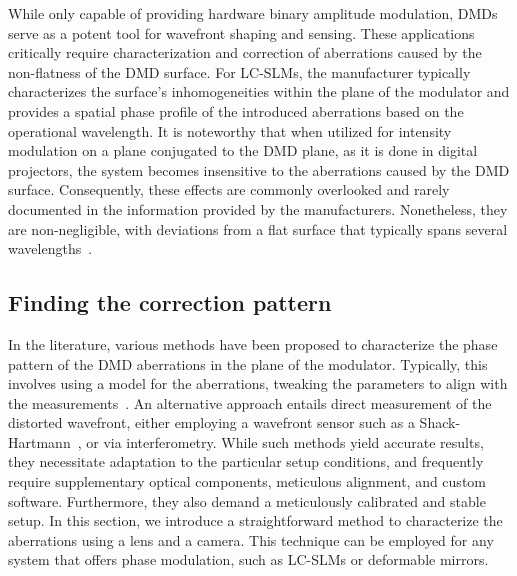 \documentclass[12pt]{iopart}
\begin{document}
While only capable of providing hardware binary amplitude modulation,
DMDs serve as a potent tool for wavefront shaping and sensing.
These applications  critically require characterization and correction of aberrations
caused by the non-flatness of the DMD surface.
For LC-SLMs, the manufacturer typically characterizes the surface's inhomogeneities within the plane of the modulator and
provides a spatial phase profile of the introduced aberrations based on the operational wavelength.
It is noteworthy that when utilized for intensity modulation on a plane conjugated to the DMD plane,
as it is done in digital projectors,
the system becomes insensitive to the aberrations caused by the DMD surface.
Consequently, these effects are commonly overlooked and rarely documented in the information provided by the manufacturers.
Nonetheless, they are non-negligible, with deviations from a flat surface
that typically spans several wavelengths~\cite{Brown2021multicolor}.\\



\subsection{Finding the correction pattern}

In the literature, various methods have been proposed to characterize
the phase pattern of the DMD aberrations in the plane of the modulator.
Typically, this involves using a model for the aberrations,
tweaking the parameters to align with the measurements~\cite{Matthes2019Optical,Scholes2019structured, Brown2021multicolor}.
An alternative approach entails direct measurement of the distorted wavefront,
either employing a wavefront sensor such as a Shack-Hartmann~\cite{Lee2023compensation},
or via interferometry.
While such methods yield accurate results,
they necessitate adaptation to the particular
setup conditions,
and frequently require supplementary optical components,
meticulous alignment,
and custom software.
Furthermore, they also demand
a meticulously calibrated and stable setup.
In this section, we introduce a straightforward method to characterize the aberrations using a lens and a camera.
This technique can be employed for any system that offers phase modulation,
such as LC-SLMs or deformable mirrors. \\
\end{document}
